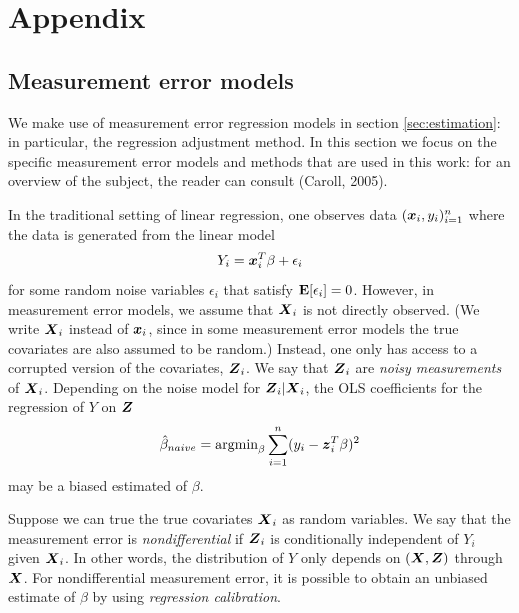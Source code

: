 \documentclass[12pt]{article}
\begin{document}
\appendix
\section{Appendix}
\subsection{Measurement error models}

We make use of measurement error regression models in
section \ref{sec:estimation}: in particular, the regression adjustment
method.  In this section we focus on the specific measurement error
models and methods that are used in this work: for an overview of the
subject, the reader can consult (Caroll, 2005).

In the traditional setting of linear regression, one observes data
$(\boldsymbol{x}_i, y_i)_{i=1}^n$ where the data is generated from the linear model
\[
Y_i = \boldsymbol{x}_i^T \beta + \epsilon_i
\]
for some random noise variables $\epsilon_i$ that satisfy
$\textbf{E}[\epsilon_i] = 0$.  However, in measurement error models, we assume
that $\boldsymbol{X}_i$ is not directly observed.  (We write $\boldsymbol{X}_i$ instead of
$\boldsymbol{x}_i$, since in some measurement error models the true covariates
are also assumed to be random.)  Instead, one only has access to a
corrupted version of the covariates, $\boldsymbol{Z}_i$.  We say that $\boldsymbol{Z}_i$
are \emph{noisy measurements} of $\boldsymbol{X}_i$.  Depending on the noise
model for $\boldsymbol{Z}_i|\boldsymbol{X}_i$, the OLS coefficients for the regression of
$Y$ on $\boldsymbol{Z}$
\begin{equation}\label{eq:ols}
\hat{\beta}_{naive} = \text{argmin}_\beta \sum_{i=1}^n (y_i - \boldsymbol{z}_i^T \beta)^2
\end{equation}
may be a biased estimated of $\beta.$

Suppose we can true the true covariates $\boldsymbol{X}_i$ as random variables.
We say that the measurement error is \emph{nondifferential} if $\boldsymbol{Z}_i$
is conditionally independent of $Y_i$ given $\boldsymbol{X}_i$.  In other words,
the distribution of $Y$ only depends on $(\boldsymbol{X}, \boldsymbol{Z})$ through $\boldsymbol{X}$.
For nondifferential measurement error, it is possible to obtain an
unbiased estimate of $\beta$ by using \emph{regression calibration}.
\end{document}
